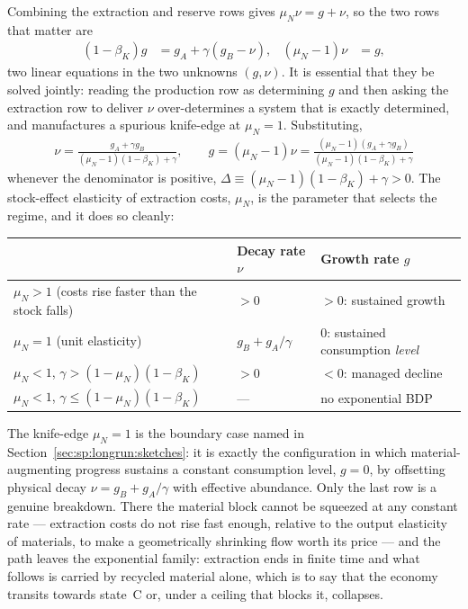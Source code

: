  Combining the extraction and reserve rows gives $\mu_N\nu=g+\nu$, so the two rows that matter are
\begin{align}
\left(1-\beta_K\right)g &= g_A+\gamma\left(g_B-\nu\right),
&
\left(\mu_N-1\right)\nu &= g,
\label{eq:app:wh:bdp-system}
\end{align}
two linear equations in the two unknowns $\left(g,\nu\right)$. It is essential that they be solved jointly: reading the production row as determining $g$ and then asking the extraction row to deliver $\nu$ over-determines a system that is exactly determined, and manufactures a spurious knife-edge at $\mu_N=1$. Substituting,
\begin{align}
\boxed{\;
\nu = \frac{g_A+\gamma g_B}{\left(\mu_N-1\right)\left(1-\beta_K\right)+\gamma},
\qquad
g = \left(\mu_N-1\right)\nu = \frac{\left(\mu_N-1\right)\left(g_A+\gamma g_B\right)}{\left(\mu_N-1\right)\left(1-\beta_K\right)+\gamma}\;}
\label{eq:app:wh:bdp-solution}
\end{align}
whenever the denominator is positive, $\Delta\equiv\left(\mu_N-1\right)\left(1-\beta_K\right)+\gamma>0$. The stock-effect elasticity of extraction costs, $\mu_N$, is the parameter that selects the regime, and it does so cleanly:
\begin{center}
\begin{tabular}{lll}
\toprule
& Decay rate $\nu$ & Growth rate $g$ \\
\midrule
$\mu_N>1$ (costs rise faster than the stock falls) & $>0$ & $>0$: sustained growth \\
$\mu_N=1$ (unit elasticity) & $g_B+g_A/\gamma$ & $0$: sustained consumption \emph{level} \\
$\mu_N<1$, $\gamma>\left(1-\mu_N\right)\left(1-\beta_K\right)$ & $>0$ & $<0$: managed decline \\
$\mu_N<1$, $\gamma\le\left(1-\mu_N\right)\left(1-\beta_K\right)$ & --- & no exponential BDP \\
\bottomrule
\end{tabular}
\end{center}
The knife-edge $\mu_N=1$ is the boundary case named in Section~\ref{sec:sp:longrun:sketches}: it is exactly the configuration in which material-augmenting progress sustains a constant consumption level, $g=0$, by offsetting physical decay $\nu=g_B+g_A/\gamma$ with effective abundance. Only the last row is a genuine breakdown. There the material block cannot be squeezed at any constant rate --- extraction costs do not rise fast enough, relative to the output elasticity of materials, to make a geometrically shrinking flow worth its price --- and the path leaves the exponential family: extraction ends in finite time and what follows is carried by recycled material alone, which is to say that the economy transits towards state~C or, under a ceiling that blocks it, collapses.

